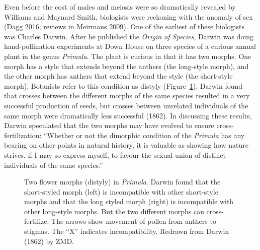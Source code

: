 \documentclass[
  letterpaper,
]{book}
\begin{document}
Even before the cost of males and meiosis were so dramatically revealed
by Williams and Maynard Smith, biologists were reckoning with the
anomaly of sex (Dagg 2016; reviews in Meirmans 2009). One of the
earliest of these biologists was Charles Darwin. After he published the
\emph{Origin of Species}, Darwin was doing hand-pollination experiments
at Down House on three species of a curious annual plant in the genus
\emph{Primula}. The plant is curious in that it has two morphs. One
morph has a style that extends beyond the anthers (the long-style
morph), and the other morph has anthers that extend beyond the style
(the short-style morph). Botanists refer to this condition as distyly
(Figure~\ref{fig-1.3}). Darwin found that crosses between the different
morphs of the same species resulted in a very successful production of
seeds, but crosses between unrelated individuals of the same morph were
dramatically less successful (1862). In discussing these results, Darwin
speculated that the two morphs may have evolved to ensure
cross-fertilization: ``Whether or not the dimorphic condition of the
\emph{Primula} has any bearing on other points in natural history, it is
valuable as showing how nature strives, if I may so express myself, to
favour the sexual union of distinct individuals of the same species.''

\begin{figure}


\caption[Two flower morphs (distyly) in
\emph{Primula}]{\label{fig-1.3}Two flower morphs (distyly) in
\emph{Primula}. Darwin found that the short-styled morph (left) is
incompatible with other short-style morphs and that the long styled
morph (right) is incompatible with other long-style morphs. But the two
different morphs can cross-fertilize. The arrows show movement of pollen
from anthers to stigmas. The ``X'' indicates incompatibility. Redrawn
from Darwin (1862) by ZMD.}

\end{figure}%
\end{document}

